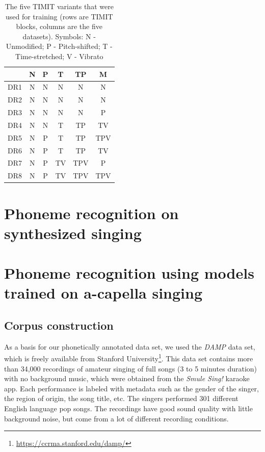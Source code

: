 \begin{table}
 \begin{center}
  \begin{tabular}{|c||c|c|c|c|c|}
  \hline
   & \textbf{N} & \textbf{P} &\textbf{T} &\textbf{TP} &\textbf{M} \\
  \hline
  DR1 & N & N & N & N & N  \\
  DR2 & N & N & N & N & N \\
  DR3 & N & N & N & N & P\\
  DR4 & N & N & T & TP & TV \\
  DR5 & N & P & T & TP & TPV \\
  DR6 & N & P & T & TP & TV \\
  DR7 & N & P & TV & TPV & P \\
  DR8 & N & P & TV & TPV & TPV \\
  \hline
 \end{tabular}
\end{center}
 \caption{The five TIMIT variants that were used for training (rows are TIMIT blocks, columns are the five datasets).
  Symbols: N - Unmodified; P - Pitch-shifted; T - Time-stretched; V - Vibrato}
 \label{tab:timit_variants}
\end{table}



\section{Phoneme recognition on synthesized singing}

\section{Phoneme recognition using models trained on a-capella singing} \label{sec:phonerec_acap}

\subsection{Corpus construction}

As a basis for our phonetically annotated data set, we used the \textit{DAMP} data set, which is freely available from Stanford University\footnote{\url{https://ccrma.stanford.edu/damp/}}\cite{phdthesis:jeffreysmith}. This data set contains more than 34,000 recordings of amateur singing of full songs (3 to 5 minutes duration) with no background music, which were obtained from the \textit{Smule Sing!} karaoke app. Each performance is labeled with metadata such as the gender of the singer, the region of origin, the song title, etc. The singers performed 301 different English language pop songs. The recordings have good sound quality with little background noise, but come from a lot of different recording conditions.


